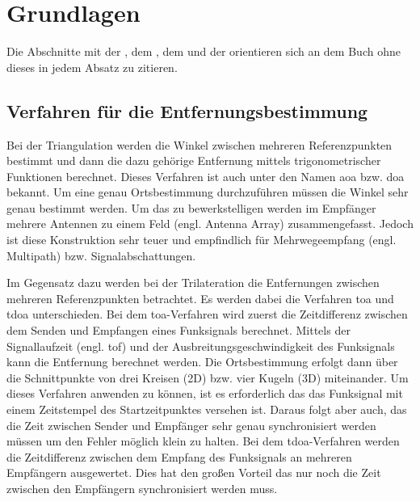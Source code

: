 %
%
%	
%
\chapter{Grundlagen}

Die Abschnitte mit der , dem , dem  und der  orientieren sich an dem Buch  \cite{thrun2005probabilistic} ohne dieses in jedem Absatz zu zitieren.


%
%
\section{Verfahren für die Entfernungsbestimmung}

Bei der Triangulation werden die Winkel zwischen mehreren Referenzpunkten bestimmt und dann die dazu gehörige Entfernung mittels trigonometrischer Funktionen berechnet. Dieses Verfahren ist auch unter den Namen \Gls{aoa} bzw. \Gls{doa} bekannt. Um eine genau Ortsbestimmung durchzuführen müssen die Winkel sehr genau bestimmt werden. Um das zu bewerkstelligen werden im Empfänger mehrere Antennen zu einem Feld (engl. Antenna Array) zusammengefasst. Jedoch ist diese Konstruktion sehr teuer und empfindlich für Mehrwegeempfang (engl. Multipath) bzw. Signalabschattungen. \cite{gezici2005localization, liu2007survey, decawave2014rtls}

Im Gegensatz dazu werden bei der Trilateration die Entfernungen zwischen mehreren Referenzpunkten betrachtet. Es werden dabei die Verfahren \Gls{toa} und \Gls{tdoa} unterschieden.
Bei dem \Gls{toa}-Verfahren wird zuerst die Zeitdifferenz zwischen dem Senden und Empfangen eines Funksignals berechnet. Mittels der Signallaufzeit (engl. \gls{tof}) und der Ausbreitungsgeschwindigkeit des Funksignals kann die Entfernung berechnet werden. Die Ortsbestimmung erfolgt dann über die Schnittpunkte von drei Kreisen (2D) bzw. vier Kugeln (3D) miteinander. Um dieses Verfahren anwenden zu können, ist es erforderlich das das Funksignal mit einem Zeitstempel des Startzeitpunktes versehen ist. Daraus folgt aber auch, das die Zeit zwischen Sender und Empfänger sehr genau synchronisiert werden müssen um den Fehler möglich klein zu halten.
Bei dem \Gls{tdoa}-Verfahren werden die Zeitdifferenz zwischen dem Empfang des Funksignals an mehreren Empfängern ausgewertet. Dies hat den großen Vorteil das nur noch die Zeit zwischen den Empfängern synchronisiert werden muss. \cite{zekavat2011handbook, decawave2014rtls}

